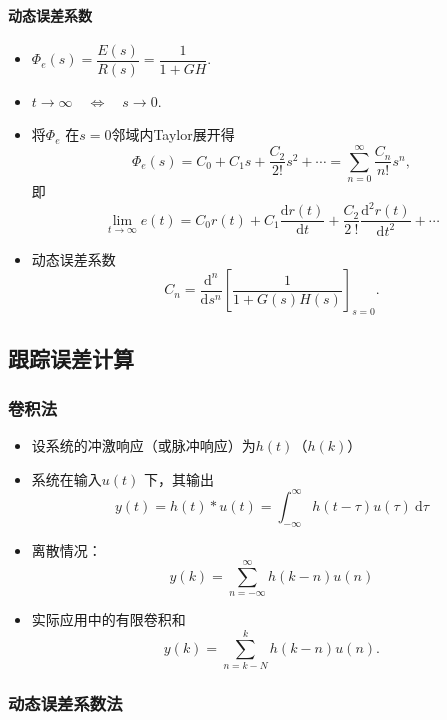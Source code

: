 \documentclass[14pt,a4paper]{article}
\theoremstyle{plain}
\theoremstyle{definition}
\theoremstyle{remark}
\theoremstyle{plain}
\theoremstyle{plain}
\theoremstyle{definition}
\begin{document}
			\paragraph{动态误差系数}%
			\label{par:动态误差系数} 
			 
				\begin{itemize}
					\item $\varPhi_e(s)=\dfrac{E(s)}{R(s)} = \dfrac{1}{1+GH}$. 
					\item $t \to \infty \quad \Longleftrightarrow \quad s\to 0$. 
					\item 将$\varPhi_e$ 在$s=0$邻域内Taylor展开得
						\[
							\varPhi_e(s) = C_0+C_1s+\dfrac{C_2}{2!}s^2 + \cdots = \sum_{n=0}^{\infty} \dfrac{C_n}{n!}s^{n}
						,\]
						即
						\[
							\lim_{t \to \infty} e(t) = C_0 r(t) + C_1 \dfrac{\mathrm d r(t)}{\mathrm dt} + \dfrac{C_2}{2\ !} \dfrac{\mathrm d^2 r(t)}{\mathrm dt^2} + \cdots 
						\]
					\item 动态误差系数
						\[
							C_n = \dfrac{\mathrm d^n}{\mathrm ds^n} \left[ \dfrac{1}{1+G(s)H(s)} \right]_{s=0}
						.\] 
				\end{itemize}  
	
		\subsection{跟踪误差计算}%
		\label{sub:跟踪误差计算}

			\subsubsection{卷积法}%
			\label{ssub:卷积法}
		
				\begin{itemize}
					\item 设系统的冲激响应（或脉冲响应）为$h(t)$（$h(k)$）
					\item 系统在输入$u(t)$ 下，其输出
						\[
							y(t) = h(t) * u(t) = \int_{-\infty}^\infty h(t-\tau) u(\tau) \ \mathrm d\tau 
						\]
					\item 离散情况：
						\[
							y(k) = \sum_{n=-\infty}^{\infty} h(k-n) u(n)
						\] 
					\item 实际应用中的有限卷积和
						\[
							y(k) = \sum_{n=k-N}^{k} h(k-n) u(n)
						.\]	
				\end{itemize} 

			\subsubsection{动态误差系数法}%
			\label{ssub:动态误差系数法}
			
\end{document}
